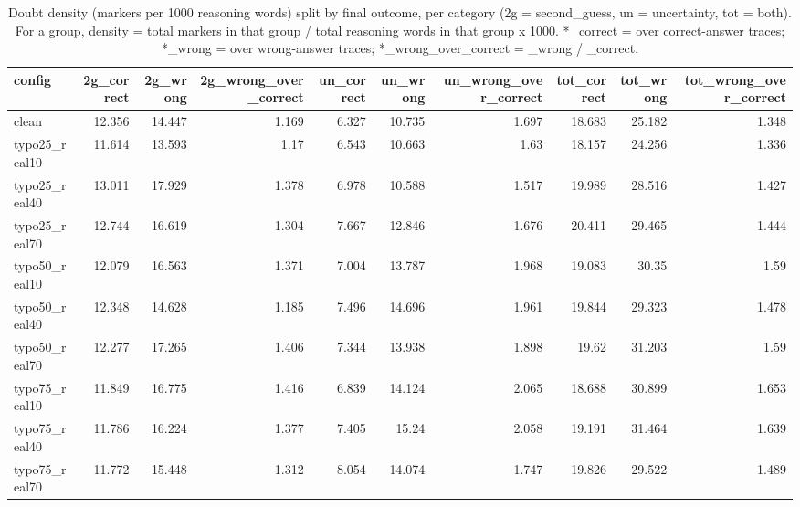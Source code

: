 \documentclass[11pt]{article}
\begin{document}
\begin{table}[H]
\centering
\caption{Doubt density (markers per 1000 reasoning words) split by final outcome, per category (2g = second\_guess, un = uncertainty, tot = both). For a group, density = total markers in that group / total reasoning words in that group x 1000. *\_correct = over correct-answer traces; *\_wrong = over wrong-answer traces; *\_wrong\_over\_correct = \_wrong / \_correct.}
\small
\begin{adjustbox}{max width=\textwidth}
\begin{tabular}{lrrrrrrrrr}
\toprule
\textbf{config} & \textbf{2g\_correct} & \textbf{2g\_wrong} & \textbf{2g\_wrong\_over\_correct} & \textbf{un\_correct} & \textbf{un\_wrong} & \textbf{un\_wrong\_over\_correct} & \textbf{tot\_correct} & \textbf{tot\_wrong} & \textbf{tot\_wrong\_over\_correct} \\
\midrule
clean & 12.356 & 14.447 & 1.169 & 6.327 & 10.735 & 1.697 & 18.683 & 25.182 & 1.348 \\
typo25\_real10 & 11.614 & 13.593 & 1.17 & 6.543 & 10.663 & 1.63 & 18.157 & 24.256 & 1.336 \\
typo25\_real40 & 13.011 & 17.929 & 1.378 & 6.978 & 10.588 & 1.517 & 19.989 & 28.516 & 1.427 \\
typo25\_real70 & 12.744 & 16.619 & 1.304 & 7.667 & 12.846 & 1.676 & 20.411 & 29.465 & 1.444 \\
typo50\_real10 & 12.079 & 16.563 & 1.371 & 7.004 & 13.787 & 1.968 & 19.083 & 30.35 & 1.59 \\
typo50\_real40 & 12.348 & 14.628 & 1.185 & 7.496 & 14.696 & 1.961 & 19.844 & 29.323 & 1.478 \\
typo50\_real70 & 12.277 & 17.265 & 1.406 & 7.344 & 13.938 & 1.898 & 19.62 & 31.203 & 1.59 \\
typo75\_real10 & 11.849 & 16.775 & 1.416 & 6.839 & 14.124 & 2.065 & 18.688 & 30.899 & 1.653 \\
typo75\_real40 & 11.786 & 16.224 & 1.377 & 7.405 & 15.24 & 2.058 & 19.191 & 31.464 & 1.639 \\
typo75\_real70 & 11.772 & 15.448 & 1.312 & 8.054 & 14.074 & 1.747 & 19.826 & 29.522 & 1.489 \\
\bottomrule
\end{tabular}
\end{adjustbox}
\end{table}
\end{document}
